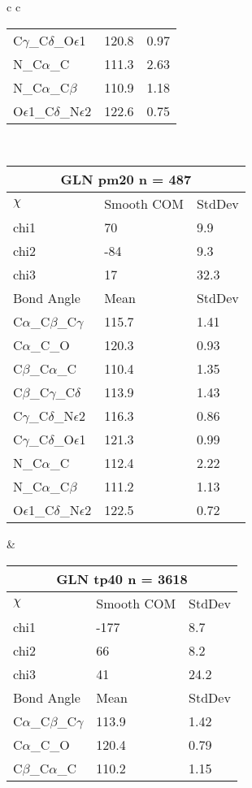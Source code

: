 \begin{longtable}{ c c }
\begin{tabular}{ l l l }
  C$\gamma$\_C$\delta$\_O$\epsilon$1 & 120.8 & 0.97\\
  N\_C$\alpha$\_C & 111.3 & 2.63\\
  N\_C$\alpha$\_C$\beta$ & 110.9 & 1.18\\
  O$\epsilon$1\_C$\delta$\_N$\epsilon$2 & 122.6 & 0.75\\
  \bottomrule
  \end{tabular}
  \\
  \begin{tabular}{ l l l }
  \toprule
  \multicolumn{3}{c}{GLN \textbf{pm20} n = 487} \\ \toprule
  $\chi$       & Smooth COM & StdDev \\ \midrule
  chi1 & 70 & 9.9 \\ 
  chi2 & -84 & 9.3 \\ 
  chi3 & 17 & 32.3 \\ \midrule
  Bond Angle   & Mean     & StdDev \\ \midrule
  C$\alpha$\_C$\beta$\_C$\gamma$ & 115.7 & 1.41\\
  C$\alpha$\_C\_O & 120.3 & 0.93\\
  C$\beta$\_C$\alpha$\_C & 110.4 & 1.35\\
  C$\beta$\_C$\gamma$\_C$\delta$ & 113.9 & 1.43\\
  C$\gamma$\_C$\delta$\_N$\epsilon$2 & 116.3 & 0.86\\
  C$\gamma$\_C$\delta$\_O$\epsilon$1 & 121.3 & 0.99\\
  N\_C$\alpha$\_C & 112.4 & 2.22\\
  N\_C$\alpha$\_C$\beta$ & 111.2 & 1.13\\
  O$\epsilon$1\_C$\delta$\_N$\epsilon$2 & 122.5 & 0.72\\
  \bottomrule
  \end{tabular}
  &
  \begin{tabular}{ l l l }
  \toprule
  \multicolumn{3}{c}{GLN \textbf{tp40} n = 3618} \\ \toprule
  $\chi$       & Smooth COM & StdDev \\ \midrule
  chi1 & -177 & 8.7 \\ 
  chi2 & 66 & 8.2 \\ 
  chi3 & 41 & 24.2 \\ \midrule
  Bond Angle   & Mean     & StdDev \\ \midrule
  C$\alpha$\_C$\beta$\_C$\gamma$ & 113.9 & 1.42\\
  C$\alpha$\_C\_O & 120.4 & 0.79\\
  C$\beta$\_C$\alpha$\_C & 110.2 & 1.15\\

\end{tabular}
\end{longtable}
